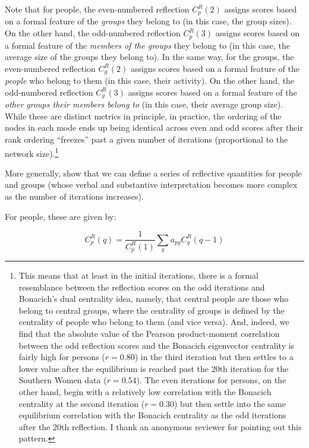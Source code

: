 \documentclass[a4paper,fleqn]{cas-sc}
\begin{document}
Note that for people, the even-numbered reflection $C^R_p(2)$ assigns scores based on a formal feature of the \textit{groups} they belong to (in this case, the group sizes). On the other hand, the odd-numbered reflection $C^R_p(3)$ assigns scores based on a formal feature of the \textit{members of the groups} they belong to (in this case, the average size of the groups they belong to). In the same way, for the groups, the even-numbered reflection $C^R_g(2)$ assigns scores based on a formal feature of the \textit{people} who belong to them (in this case, their activity). On the other hand, the odd-numbered reflection $C^R_g(3)$ assigns scores based on a formal feature of the \textit{other groups their members belong to} (in this case, their average group size). While these are distinct metrics in principle, in practice, the ordering of the nodes in each mode ends up being identical across even and odd scores after their rank ordering ``freezes'' past a given number of iterations (proportional to the network size).\footnote{This means that at least in the initial iterations, there is a formal resemblance between the reflection scores on the odd iterations and Bonacich's dual centrality idea, namely, that central people are those who belong to central groups, where the centrality of groups is defined by the centrality of people who belong to them (and vice versa). And, indeed, we find that the absolute value of the Pearson product-moment correlation between the odd reflection scores and the Bonacich eigenvector centrality is fairly high for persons ($r = 0.80$) in the third iteration but then settles to a lower value after the equilibrium is reached past the 20th iteration for the Southern Women data ($r = 0.54$). The even iterations for persons, on the other hand, begin with a relatively low correlation with the Bonacich centrality at the second iteration ($r = 0.30$) but then settle into the same equilibrium correlation with the Bonacich centrality as the odd iterations after the 20th reflection. I thank an anonymous reviewer for pointing out this pattern.} 

More generally, \citet{hidalgo2009building} show that we can define a series of reflective quantities for people and groups (whose verbal and substantive interpretation becomes more complex as the number of iterations increases). 

For people, these are given by:

\begin{equation}   
    C^R_p(q) = \frac{1}{C^R_p(1)}\sum_g a_{pg}C^R_g(q-1) 
   \label{eq:Rq_p}
\end{equation}
\end{document}
